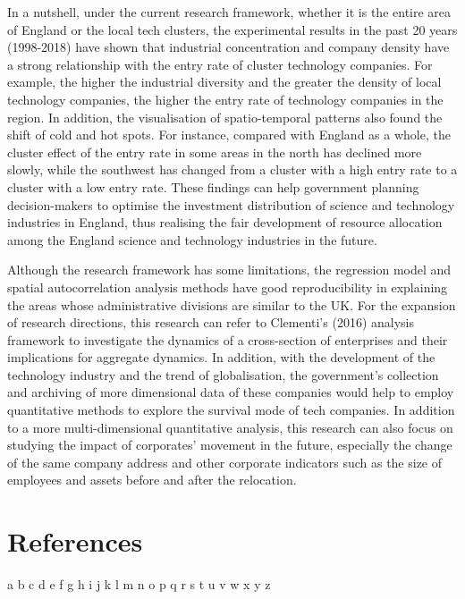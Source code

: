 \documentclass[
  12pt,
  oneside]{book}
\begin{document}
In a nutshell, under the current research framework, whether it is the entire area of England or the local tech clusters, the experimental results in the past 20 years (1998-2018) have shown that industrial concentration and company density have a strong relationship with the entry rate of cluster technology companies. For example, the higher the industrial diversity and the greater the density of local technology companies, the higher the entry rate of technology companies in the region. In addition, the visualisation of spatio-temporal patterns also found the shift of cold and hot spots. For instance, compared with England as a whole, the cluster effect of the entry rate in some areas in the north has declined more slowly, while the southwest has changed from a cluster with a high entry rate to a cluster with a low entry rate. These findings can help government planning decision-makers to optimise the investment distribution of science and technology industries in England, thus realising the fair development of resource allocation among the England science and technology industries in the future.

Although the research framework has some limitations, the regression model and spatial autocorrelation analysis methods have good reproducibility in explaining the areas whose administrative divisions are similar to the UK. For the expansion of research directions, this research can refer to Clementi's (2016) analysis framework to investigate the dynamics of a cross-section of enterprises and their implications for aggregate dynamics. In addition, with the development of the technology industry and the trend of globalisation, the government's collection and archiving of more dimensional data of these companies would help to employ quantitative methods to explore the survival mode of tech companies. In addition to a more multi-dimensional quantitative analysis, this research can also focus on studying the impact of corporates' movement in the future, especially the change of the same company address and other corporate indicators such as the size of employees and assets before and after the relocation.

\hypertarget{references}{%
\chapter*{References}\label{references}}

a b c d e f g h i j k l m n o p q r s t u v w x y z
\end{document}
